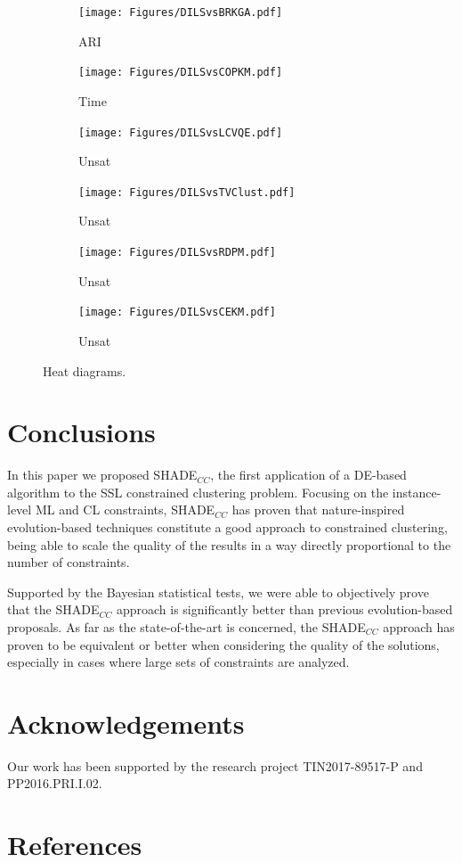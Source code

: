 \documentclass[review]{elsarticle}
\begin{document}
\begin{figure}[ht!]
	\centering
	\begin{subfigure}{.45\textwidth}
		\texttt{[image: Figures/DILSvsBRKGA.pdf]}
		\caption{ARI}
		\label{fig:DILSvsBRKGA}
	\end{subfigure}
	\begin{subfigure}{.45\textwidth}
		\texttt{[image: Figures/DILSvsCOPKM.pdf]}
		\caption{Time}
		\label{fig:DILSvsCOPKM}
	\end{subfigure}
	\begin{subfigure}{.45\textwidth}
		\texttt{[image: Figures/DILSvsLCVQE.pdf]}
		\caption{Unsat}
		\label{fig:DILSvsLCVQE}
	\end{subfigure}
	\begin{subfigure}{.45\textwidth}
		\texttt{[image: Figures/DILSvsTVClust.pdf]}
		\caption{Unsat}
		\label{fig:DILSvsTVClust}
	\end{subfigure}
	\begin{subfigure}{.45\textwidth}
		\texttt{[image: Figures/DILSvsRDPM.pdf]}
		\caption{Unsat}
		\label{fig:DILSvsRDPM}
	\end{subfigure}
	\begin{subfigure}{.45\textwidth}
		\texttt{[image: Figures/DILSvsCEKM.pdf]}
		\caption{Unsat}
		\label{fig:DILSvsCEKM}
	\end{subfigure}
	\caption{Heat diagrams.}
\end{figure}


\clearpage

\section{Conclusions} \label{sec:conclusiones}

In this paper we proposed SHADE$_{CC}$, the first application of a DE-based algorithm to the SSL constrained clustering problem. Focusing on the instance-level ML and CL constraints, SHADE$_{CC}$ has proven that nature-inspired evolution-based techniques constitute a good approach to constrained clustering, being able to scale the quality of the results in a way directly proportional to the number of constraints.
 
Supported by the Bayesian statistical tests, we were able to objectively prove that the SHADE$_{CC}$ approach is significantly better than previous evolution-based proposals. As far as the state-of-the-art is concerned, the SHADE$_{CC}$ approach has proven to be equivalent or better when considering the quality of the solutions, especially in cases where large sets of constraints are analyzed.

\section{Acknowledgements}

Our work has been supported by the research project TIN2017-89517-P and PP2016.PRI.I.02.

\clearpage

\section*{References}


\end{document}
